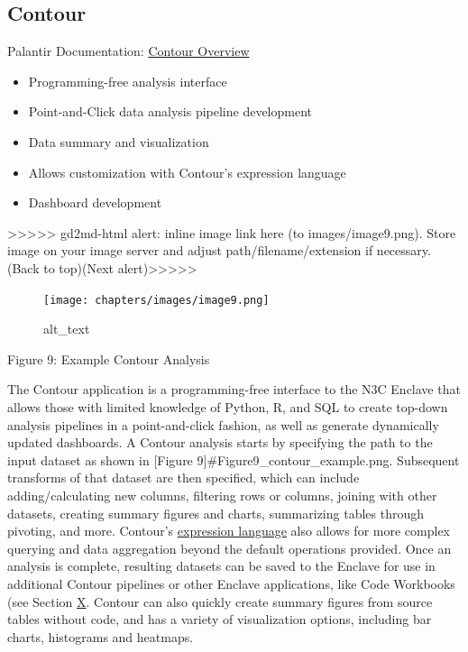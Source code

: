 \documentclass[
  letterpaper,
  DIV=11,
  numbers=noendperiod]{scrreprt}
\providecommand{\tightlist}{%
  \setlength{\itemsep}{0pt}\setlength{\parskip}{0pt}}\usepackage{longtable,booktabs,array}
\begin{document}
\hypertarget{contour}{%
\subsection{Contour}\label{contour}}

Palantir Documentation:
\href{https://www.palantir.com/docs/foundry/contour/overview/}{Contour
Overview}

\begin{itemize}
\tightlist
\item
  Programming-free analysis interface
\item
  Point-and-Click data analysis pipeline development
\item
  Data summary and visualization
\item
  Allows customization with Contour's expression language
\item
  Dashboard development
\end{itemize}

{\textgreater\textgreater\textgreater\textgreater\textgreater{}
gd2md-html alert: inline image link here (to images/image9.png). Store
image on your image server and adjust path/filename/extension if
necessary. }(Back to top)(Next
alert){\textgreater\textgreater\textgreater\textgreater\textgreater{} }

\begin{figure}

{\centering \texttt{[image: chapters/images/image9.png]}

}

\caption{alt\_text}

\end{figure}

Figure 9: Example Contour Analysis

The Contour application is a programming-free interface to the N3C
Enclave that allows those with limited knowledge of Python, R, and SQL
to create top-down analysis pipelines in a point-and-click fashion, as
well as generate dynamically updated dashboards. A Contour analysis
starts by specifying the path to the input dataset as shown in {[}Figure
9{]}\#Figure9\_contour\_example.png. Subsequent transforms of that
dataset are then specified, which can include adding/calculating new
columns, filtering rows or columns, joining with other datasets,
creating summary figures and charts, summarizing tables through
pivoting, and more. Contour's
\href{https://www.palantir.com/docs/foundry/contour/expressions-overview/}{expression
language} also allows for more complex querying and data aggregation
beyond the default operations provided. Once an analysis is complete,
resulting datasets can be saved to the Enclave for use in additional
Contour pipelines or other Enclave applications, like Code Workbooks
(see Section \protect\hyperlink{Code-Workbooks}{X}. Contour can also
quickly create summary figures from source tables without code, and has
a variety of visualization options, including bar charts, histograms and
heatmaps.
\end{document}
